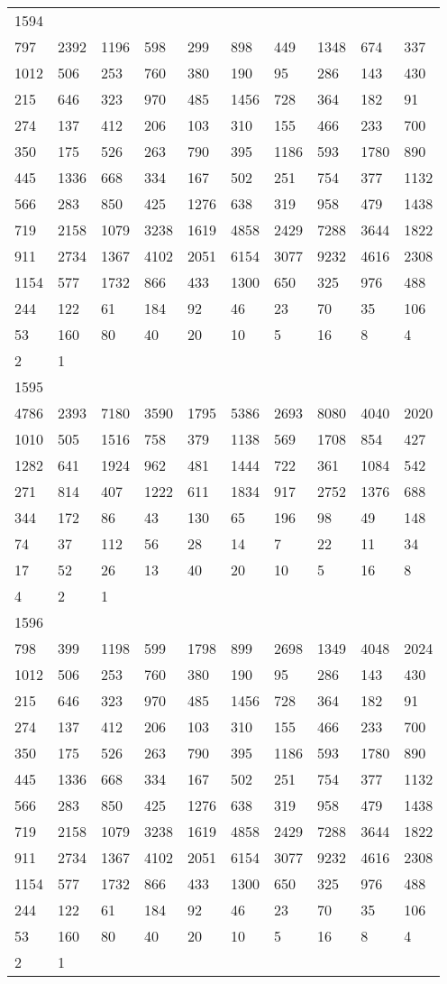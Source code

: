 \begin{longtable}{*{10}{l}}
1594&&&&&&&&&\\
797& 2392& 1196& 598& 299& 898& 449& 1348& 674& 337\\
1012& 506& 253& 760& 380& 190& 95& 286& 143& 430\\
215& 646& 323& 970& 485& 1456& 728& 364& 182& 91\\
274& 137& 412& 206& 103& 310& 155& 466& 233& 700\\
350& 175& 526& 263& 790& 395& 1186& 593& 1780& 890\\
445& 1336& 668& 334& 167& 502& 251& 754& 377& 1132\\
566& 283& 850& 425& 1276& 638& 319& 958& 479& 1438\\
719& 2158& 1079& 3238& 1619& 4858& 2429& 7288& 3644& 1822\\
911& 2734& 1367& 4102& 2051& 6154& 3077& 9232& 4616& 2308\\
1154& 577& 1732& 866& 433& 1300& 650& 325& 976& 488\\
244& 122& 61& 184& 92& 46& 23& 70& 35& 106\\
53& 160& 80& 40& 20& 10& 5& 16& 8& 4\\
2& 1& \\

1595&&&&&&&&&\\
4786& 2393& 7180& 3590& 1795& 5386& 2693& 8080& 4040& 2020\\
1010& 505& 1516& 758& 379& 1138& 569& 1708& 854& 427\\
1282& 641& 1924& 962& 481& 1444& 722& 361& 1084& 542\\
271& 814& 407& 1222& 611& 1834& 917& 2752& 1376& 688\\
344& 172& 86& 43& 130& 65& 196& 98& 49& 148\\
74& 37& 112& 56& 28& 14& 7& 22& 11& 34\\
17& 52& 26& 13& 40& 20& 10& 5& 16& 8\\
4& 2& 1& \\

1596&&&&&&&&&\\
798& 399& 1198& 599& 1798& 899& 2698& 1349& 4048& 2024\\
1012& 506& 253& 760& 380& 190& 95& 286& 143& 430\\
215& 646& 323& 970& 485& 1456& 728& 364& 182& 91\\
274& 137& 412& 206& 103& 310& 155& 466& 233& 700\\
350& 175& 526& 263& 790& 395& 1186& 593& 1780& 890\\
445& 1336& 668& 334& 167& 502& 251& 754& 377& 1132\\
566& 283& 850& 425& 1276& 638& 319& 958& 479& 1438\\
719& 2158& 1079& 3238& 1619& 4858& 2429& 7288& 3644& 1822\\
911& 2734& 1367& 4102& 2051& 6154& 3077& 9232& 4616& 2308\\
1154& 577& 1732& 866& 433& 1300& 650& 325& 976& 488\\
244& 122& 61& 184& 92& 46& 23& 70& 35& 106\\
53& 160& 80& 40& 20& 10& 5& 16& 8& 4\\
2& 1& \\


\end{longtable}
